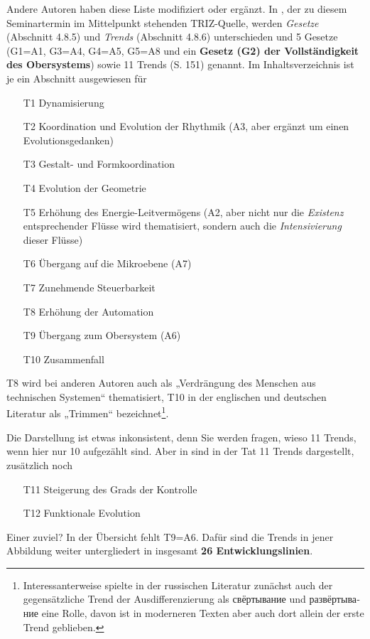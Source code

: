 \documentclass[11pt,a4paper]{article}
\begin{document}
Andere Autoren haben diese Liste modifiziert oder ergänzt.  In \cite[Abschnitt
  4.8]{Koltze2017}, der zu diesem Seminartermin im Mittelpunkt stehenden
TRIZ-Quelle, werden \emph{Gesetze} (Abschnitt 4.8.5) und \emph{Trends}
(Abschnitt 4.8.6) unterschieden und 5 Gesetze (G1=A1, G3=A4, G4=A5, G5=A8 und
ein \textbf{Gesetz (G2) der Vollständigkeit des Obersystems}) sowie 11 Trends
(S. 151) genannt. Im Inhaltsverzeichnis ist je ein Abschnitt ausgewiesen für
\begin{itemize}[noitemsep]
\item[T1] Dynamisierung
\item[T2] Koordination und Evolution der Rhythmik (A3, aber ergänzt um einen
  Evolutionsgedanken)
\item[T3] Gestalt- und Formkoordination
\item[T4] Evolution der Geometrie
\item[T5] Erhöhung des Energie-Leitvermögens (A2, aber nicht nur die
  \emph{Existenz} entsprechender Flüsse wird thematisiert, sondern auch die
  \emph{Intensivierung} dieser Flüsse)
\item[T6] Übergang auf die Mikroebene (A7)
\item[T7] Zunehmende Steuerbarkeit 
\item[T8] Erhöhung der Automation 
\item[T9] Übergang zum Obersystem (A6)
\item[T10] Zusammenfall 
\end{itemize}
\newpage
T8 wird bei anderen Autoren auch als „Verdrängung des Menschen aus technischen
Systemen“ thematisiert, T10 in der englischen und deutschen Literatur als
„Trimmen“ bezeichnet\footnote{Interessanterweise spielte in der russischen
  Literatur zunächst auch der gegensätzliche Trend der Ausdifferenzierung als
  \foreignlanguage{russian}{свёртывание} und
  \foreignlanguage{russian}{развёртывание} eine Rolle, davon ist in moderneren
  Texten aber auch dort allein der erste Trend geblieben.}.

Die Darstellung ist etwas inkonsistent, denn Sie werden fragen, wieso 11
Trends, wenn hier nur 10 aufgezählt sind. Aber in \cite[Abb. 4.65]{Koltze2017}
sind in der Tat 11 Trends dargestellt, zusätzlich noch
\begin{itemize}[noitemsep]
\item[T11] Steigerung des Grads der Kontrolle
\item[T12] Funktionale Evolution
\end{itemize}
Einer zuviel? In der Übersicht fehlt T9=A6.  Dafür sind die Trends in jener
Abbildung weiter untergliedert in insgesamt \textbf{26 Entwicklungslinien}.
\end{document}
